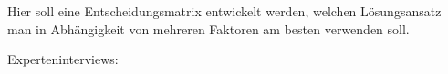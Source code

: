Hier soll eine Entscheidungsmatrix entwickelt werden, welchen Lösungsansatz man in Abhängigkeit von mehreren Faktoren am besten verwenden soll. \newline

Experteninterviews:



